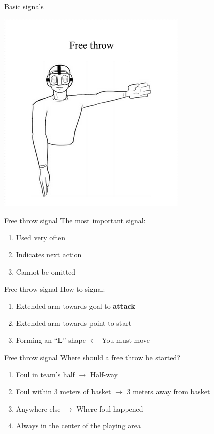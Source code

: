 \begin{frame}{Basic signals}
    \begin{center}
        \includegraphics[scale=0.8]{freeThrowSignal}
    \end{center}
\end{frame}

\begin{frame}{Free throw signal}
    The most important signal:
    \begin{enumerate}
        \item Used very often
        \item Indicates next action
        \item Cannot be omitted
    \end{enumerate}
\end{frame}

\begin{frame}{Free throw signal}
    How to signal:
    \begin{enumerate}
        \item Extended arm towards goal to \textbf{attack}
        \item Extended arm towards point to start

              \pause{}

        \item Forming an ``\textbf{L}'' shape \pause{} $\leftarrow$ You must move
    \end{enumerate}
\end{frame}

\begin{frame}{Free throw signal}
    Where should a free throw be started?

    \begin{enumerate}
        \item Foul in team's half $\rightarrow$ Half-way
        \item Foul within 3 meters of basket $\rightarrow$ 3 meters away from basket
        \item Anywhere else $\rightarrow$ Where foul happened
        \item Always in the center of the playing area
    \end{enumerate}
\end{frame}